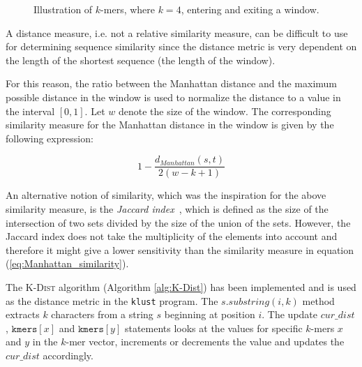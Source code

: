 \begin{figure}[H]
\centering
{}
\caption{Illustration of $k$-mers, where $k=4$, entering and exiting a window.}
\label{fig:d2_forward_differences}
\end{figure}

A distance measure, i.e. not a relative similarity measure, can be difficult to
use for determining sequence similarity since the distance metric is very
dependent on the length of the shortest sequence (the length of the window).

For this reason, the ratio between the Manhattan distance and the maximum
possible distance in the window is used to normalize the distance to a value in
the interval $[0,1]$. Let $w$ denote the size of the window. The corresponding
similarity measure for the Manhattan distance in the window is given by the
following expression:

\begin{equation}
  1 - \frac{d_{Manhattan}(s,t)}{2(w - k + 1)} \label{eq:Manhattan_similarity}
\end{equation}

An alternative notion of similarity, which was the inspiration for the above
similarity measure, is the \emph{Jaccard index}~\cite{jaccard1912}, which is
defined as the size of the intersection of two sets divided by the size of the
union of the sets.  However, the Jaccard index does not take the multiplicity
of the elements into account and therefore it might give a lower sensitivity
than the similarity measure in equation (\ref{eq:Manhattan_similarity}).

The \textsc{K-Dist} algorithm (Algorithm \ref{alg:K-Dist}) has been implemented
and is used as the distance metric in the \texttt{klust} program. The
$s.substring(i,k)$ method extracts $k$ characters from a string $s$ beginning
at position $i$. The update $cur\_dist$, $\mathtt{kmers}[x]$ and
$\mathtt{kmers}[y]$ statements looks at the values for specific $k$-mers $x$
and $y$ in the $k$-mer vector, increments or decrements the value and updates
the $cur\_dist$ accordingly.


